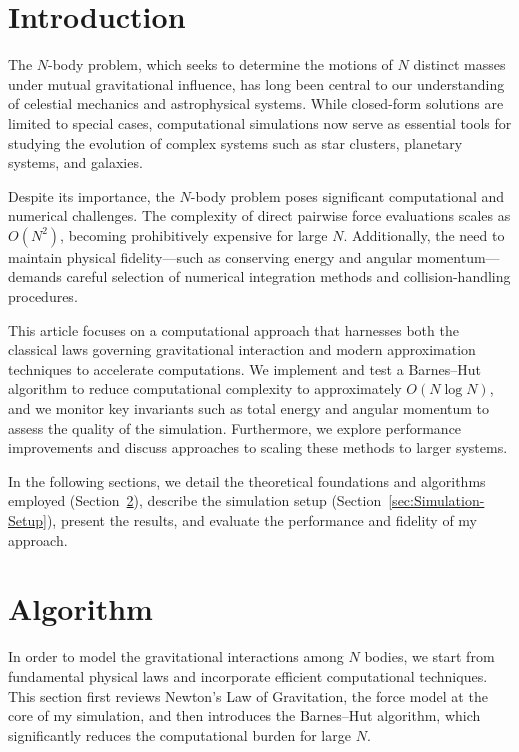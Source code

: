 \documentclass[a4paper, 12pt, oneside, onecolumn]{article}
\begin{document}
\begin{multicols}{2}


\section{Introduction}

The $N$-body problem, which seeks to determine the motions of $N$ distinct masses under mutual gravitational influence, has long been central to our understanding of celestial mechanics and astrophysical systems. While closed-form solutions are limited to special cases, computational simulations now serve as essential tools for studying the evolution of complex systems such as star clusters, planetary systems, and galaxies.

Despite its importance, the $N$-body problem poses significant computational and numerical challenges. The complexity of direct pairwise force evaluations scales as $O(N^2)$, becoming prohibitively expensive for large $N$. Additionally, the need to maintain physical fidelity—such as conserving energy and angular momentum—demands careful selection of numerical integration methods and collision-handling procedures.

This article focuses on a computational approach that harnesses both the classical laws governing gravitational interaction and modern approximation techniques to accelerate computations. We implement and test a Barnes–Hut algorithm to reduce computational complexity to approximately $O(N \log N)$, and we monitor key invariants such as total energy and angular momentum to assess the quality of the simulation. Furthermore, we explore performance improvements and discuss approaches to scaling these methods to larger systems.

In the following sections, we detail the theoretical foundations and algorithms employed (Section~\ref{sec:algorithm}), describe the simulation setup (Section~\ref{sec:Simulation-Setup}), present the results, and evaluate the performance and fidelity of my approach.


\section{Algorithm}\label{sec:algorithm}

In order to model the gravitational interactions among $N$ bodies, we start from fundamental physical laws and incorporate efficient computational techniques. This section first reviews Newton’s Law of Gravitation, the force model at the core of my simulation, and then introduces the Barnes–Hut algorithm, which significantly reduces the computational burden for large $N$.


\end{multicols}
\end{document}
